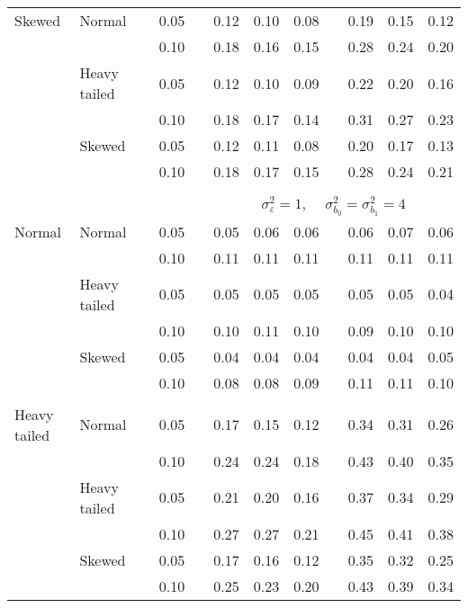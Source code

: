 \begin{table}[ht]
\begin{scriptsize}
\begin{tabular}{ll p{.1cm} c p{.1cm} rrr p{.1cm} rrr}
Skewed       & Normal       && 0.05 &&  0.12 & 0.10 & 0.08 && 0.19 & 0.15 & 0.12 \\ 
             &              && 0.10 &&  0.18 & 0.16 & 0.15 && 0.28 & 0.24 & 0.20 \\ 
             & Heavy tailed && 0.05 &&  0.12 & 0.10 & 0.09 && 0.22 & 0.20 & 0.16 \\ 
             &              && 0.10 &&  0.18 & 0.17 & 0.14 && 0.31 & 0.27 & 0.23 \\ 
             & Skewed       && 0.05 &&  0.12 & 0.11 & 0.08 && 0.20 & 0.17 & 0.13 \\ 
             &              && 0.10 &&  0.18 & 0.17 & 0.15 && 0.28 & 0.24 & 0.21 \\ 


&&&&&&&&&&&\\
& && && \multicolumn{7}{c}{$\sigma_{\varepsilon}^2 = 1$, \ \ $\sigma_{b_0}^2 = \sigma_{b_1}^2 = 4$} \\ \cline{6-12}
\rowcolor{gray!20}Normal       & Normal       && 0.05 &&  0.05 & 0.06 & 0.06 && 0.06 & 0.07 & 0.06 \\ 
\rowcolor{gray!20}             &              && 0.10 &&  0.11 & 0.11 & 0.11 && 0.11 & 0.11 & 0.11 \\ 
\rowcolor{gray!20}             & Heavy tailed && 0.05 &&  0.05 & 0.05 & 0.05 && 0.05 & 0.05 & 0.04 \\ 
\rowcolor{gray!20}             &              && 0.10 &&  0.10 & 0.11 & 0.10 && 0.09 & 0.10 & 0.10 \\ 
\rowcolor{gray!20}             & Skewed       && 0.05 &&  0.04 & 0.04 & 0.04 && 0.04 & 0.04 & 0.05 \\ 
\rowcolor{gray!20}             &              && 0.10 &&  0.08 & 0.08 & 0.09 && 0.11 & 0.11 & 0.10 \\ 
             &&&&&&&&&&&\\
Heavy tailed & Normal       && 0.05 &&  0.17 & 0.15 & 0.12 && 0.34 & 0.31 & 0.26 \\ 
             &              && 0.10 &&  0.24 & 0.24 & 0.18 && 0.43 & 0.40 & 0.35 \\ 
             & Heavy tailed && 0.05 &&  0.21 & 0.20 & 0.16 && 0.37 & 0.34 & 0.29 \\ 
             &              && 0.10 &&  0.27 & 0.27 & 0.21 && 0.45 & 0.41 & 0.38 \\ 
             & Skewed       && 0.05 &&  0.17 & 0.16 & 0.12 && 0.35 & 0.32 & 0.25 \\ 
             &              && 0.10 &&  0.25 & 0.23 & 0.20 && 0.43 & 0.39 & 0.34 \\ 

\end{tabular}
\end{scriptsize}
\end{table}
